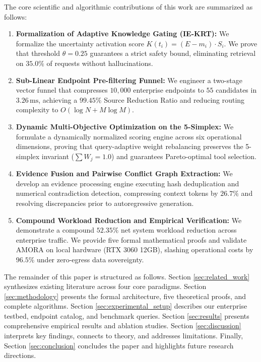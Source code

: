 \documentclass[conference,onecolumn,10pt]{IEEEtran}
\begin{document}
The core scientific and algorithmic contributions of this work are summarized as follows:
\begin{enumerate}
    \item \textbf{Formalization of Adaptive Knowledge Gating (IE-KRT):} We formalize the uncertainty activation score $K(t_i) = (E - m_i) \cdot S_i$. We prove that threshold $\theta = 0.25$ guarantees a strict safety bound, eliminating retrieval on $35.0\%$ of requests without hallucinations.
    \item \textbf{Sub-Linear Endpoint Pre-filtering Funnel:} We engineer a two-stage vector funnel that compresses $10{,}000$ enterprise endpoints to $55$ candidates in $3.26\,\text{ms}$, achieving a $99.45\%$ Source Reduction Ratio and reducing routing complexity to $O(\log N + M \log M)$.
    \item \textbf{Dynamic Multi-Objective Optimization on the 5-Simplex:} We formulate a dynamically normalized scoring engine across six operational dimensions, proving that query-adaptive weight rebalancing preserves the 5-simplex invariant ($\sum W_j = 1.0$) and guarantees Pareto-optimal tool selection.
    \item \textbf{Evidence Fusion and Pairwise Conflict Graph Extraction:} We develop an evidence processing engine executing hash deduplication and numerical contradiction detection, compressing context tokens by $26.7\%$ and resolving discrepancies prior to autoregressive generation.
    \item \textbf{Compound Workload Reduction and Empirical Verification:} We demonstrate a compound $52.35\%$ net system workload reduction across enterprise traffic. We provide five formal mathematical proofs and validate AMORA on local hardware (RTX 3060 12GB), slashing operational costs by $96.5\%$ under zero-egress data sovereignty.
\end{enumerate}

The remainder of this paper is structured as follows. Section \ref{sec:related_work} synthesizes existing literature across four core paradigms. Section \ref{sec:methodology} presents the formal architecture, five theoretical proofs, and complete algorithms. Section \ref{sec:experimental_setup} describes our enterprise testbed, endpoint catalog, and benchmark queries. Section \ref{sec:results} presents comprehensive empirical results and ablation studies. Section \ref{sec:discussion} interprets key findings, connects to theory, and addresses limitations. Finally, Section \ref{sec:conclusion} concludes the paper and highlights future research directions.
\end{document}

